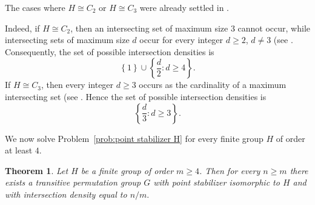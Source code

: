 \documentclass[11pt]{article}
\newtheorem{theorem}{Theorem}[section]
\begin{document}
The cases where \(H\cong C_2\) or
\(H\cong C_3\) were already settled in
\cite{HujdurovicKovacsKutnarMarusic2025}.

Indeed, if \(H\cong C_2\), then an intersecting set of
maximum size \(3\) cannot occur, while intersecting sets of maximum
size \(d\) occur for every integer \(d\geq 2\), \(d\neq 3\) (see \cite[Example 3.3]{HujdurovicKovacsKutnarMarusic2025}.
Consequently, the set of possible intersection densities is
\[
\left\{1\right\}
\cup
\left\{\frac{d}{2}:d\geq 4\right\}.
\]
If \(H\cong C_3\), then every integer \(d\geq 3\) occurs as
the cardinality of a maximum intersecting set (see \cite[Example 7.1]{HujdurovicKovacsKutnarMarusic2025}. Hence the set of
possible intersection densities is
\[
\left\{\frac{d}{3}:d\geq 3\right\}.
\]

We now solve Problem~\ref{prob:point stabilizer H} for every finite group \(H\) of order at
least \(4\).

\begin{theorem}\label{thm:Density over H}
Let \(H\) be a finite group of order \(m\geq 4\). Then for every $n\geq m$ there exists a transitive permutation group $G$ with point stabilizer isomorphic to $H$ and with intersection density equal to $n/m.$
\end{theorem}
\end{document}

